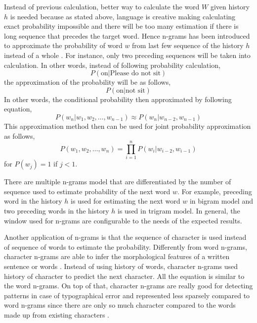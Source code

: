     Instead of previous calculation, better way to calculate the word
    $W$ given history $h$ is needed because as stated above, language
    is creative making calculating exact probability impossible and
    there will be too many estimation if there is long sequence that
    precedes the target word. Hence n-grams has been introduced to
    approximate the probability of word $w$ from last few sequence of
    the history $h$ instead of a whole
    \citep{speech2009Jurafsky:2009:SLP:1214993}. For instance, only
    two preceding sequences will be taken into calculation.
    In other words, instead of following probability calculation,
    \begin{equation}
        P(\text{on} \vert \text{Please do not sit})
    \end{equation}
    the approximation of the probability will be as follows,
    \begin{equation}
        P(\text{on} \vert \text{not sit})
    \end{equation}
    In other words, the conditional probability then approximated by
    following equation,
    \begin{equation}
        \label{eq:condprobapprox}
        P(w_n \vert w_1, w_2, \dots, w_{n-1}) \approx P(w_n \vert w_{n-2}, w_{n-1})
    \end{equation}
    This approximation method then can be used for joint probability
    approximation as follows,
    \begin{equation}
        P(w_1, w_2, \dots, w_n) = \prod_{i=1}^n P(w_i \vert w_{i-2}, w_{i-1})
    \end{equation}
    for $P(w_j) = 1$ if $j < 1$.

    There are multiple n-grams model that are differentiated by the number
    of sequence used to estimate probability of the next word $w$. For
    example, preceding word in the history $h$ is used for estimating
    the next word $w$ in bigram model and two preceding words in the
    history $h$ is used in trigram model. In general, the window used
    for n-grams are configurable to the needs of the expected results.
    
    Another application of n-grams is that the sequence of character
    is used instead of sequence of words to estimate the probability.
    Differently from word n-grams, character n-grams are able to infer
    the morphological features of a written sentence or words
    \citep{kulmizev-etal-2017-power}. Instead of using history of
    words, character n-grams used history of character to predict the
    next character. All the equation is similar to the word n-grams. On
    top of that, character n-grams are really good for detecting
    patterns in case of typographical error and represented less
    sparsely compared to word n-grams since there are only so much
    character compared to the words made up from existing characters
    \citep{kulmizev-etal-2017-power}.